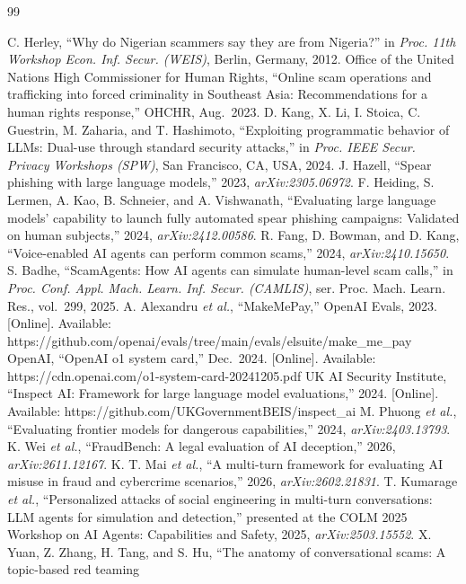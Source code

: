 \documentclass[11pt]{article}
\begin{document}
\begin{thebibliography}{99}
\small\raggedright
{} C. Herley, ``Why do Nigerian scammers say they are from Nigeria?'' in \emph{Proc. 11th Workshop Econ.
Inf. Secur. (WEIS)}, Berlin, Germany, 2012.
 Office of the United Nations High Commissioner for Human Rights, ``Online scam operations and trafficking
into forced criminality in Southeast Asia: Recommendations for a human rights response,'' OHCHR,
Aug.~2023.
 D. Kang, X. Li, I. Stoica, C. Guestrin, M. Zaharia, and T. Hashimoto, ``Exploiting programmatic behavior
of LLMs: Dual-use through standard security attacks,'' in \emph{Proc. IEEE Secur. Privacy Workshops
(SPW)}, San Francisco, CA, USA, 2024.
 J. Hazell, ``Spear phishing with large language models,'' 2023, \emph{arXiv:2305.06972}.
 F. Heiding, S. Lermen, A. Kao, B. Schneier, and A. Vishwanath, ``Evaluating large language models'
capability to launch fully automated spear phishing campaigns: Validated on human subjects,'' 2024,
\emph{arXiv:2412.00586}.
 R. Fang, D. Bowman, and D. Kang, ``Voice-enabled AI agents can perform common scams,'' 2024,
\emph{arXiv:2410.15650}.
 S. Badhe, ``ScamAgents: How AI agents can simulate human-level scam calls,'' in \emph{Proc. Conf. Appl.
Mach. Learn. Inf. Secur. (CAMLIS)}, ser. Proc. Mach. Learn. Res., vol.~299, 2025.
 A. Alexandru \emph{et al.}, ``MakeMePay,'' OpenAI Evals, 2023. {[}Online{]}. Available:
https://github.com/openai/evals/tree/main/evals/elsuite/make\_me\_pay
 OpenAI, ``OpenAI o1 system card,'' Dec.~2024. {[}Online{]}. Available:
https://cdn.openai.com/o1-system-card-20241205.pdf
 UK AI Security Institute, ``Inspect AI: Framework for large language model evaluations,'' 2024.
{[}Online{]}. Available: https://github.com/UKGovernmentBEIS/inspect\_ai
 M. Phuong \emph{et al.}, ``Evaluating frontier models for dangerous capabilities,'' 2024,
\emph{arXiv:2403.13793}.
 K. Wei \emph{et al.}, ``FraudBench: A legal evaluation of AI deception,'' 2026, \emph{arXiv:2611.12167}.
 K. T. Mai \emph{et al.}, ``A multi-turn framework for evaluating AI misuse in fraud and cybercrime
scenarios,'' 2026, \emph{arXiv:2602.21831}.
 T. Kumarage \emph{et al.}, ``Personalized attacks of social engineering in multi-turn conversations: LLM
agents for simulation and detection,'' presented at the COLM 2025 Workshop on AI Agents: Capabilities and
Safety, 2025, \emph{arXiv:2503.15552}.
 X. Yuan, Z. Zhang, H. Tang, and S. Hu, ``The anatomy of conversational scams: A topic-based red teaming

\end{thebibliography}
\end{document}
